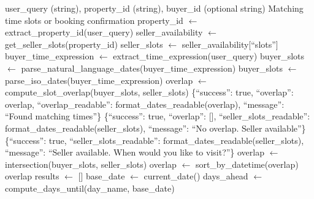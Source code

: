 \begin{algorithm}[H]
\caption{Booking Agent Slot Matching}
\label{alg:booking}
\begin{algorithmic}[1]
\REQUIRE user\_query (string), property\_id (string), buyer\_id (optional string)
\ENSURE Matching time slots or booking confirmation
\STATE {}
    \STATE property\_id $\leftarrow$ extract\_property\_id(user\_query)
\ENDIF
\STATE
\STATE {}
\STATE seller\_availability $\leftarrow$ get\_seller\_slots(property\_id)
\STATE seller\_slots $\leftarrow$ seller\_availability[``slots'']
\STATE
\STATE {}
\STATE buyer\_time\_expression $\leftarrow$ extract\_time\_expression(user\_query)
\STATE
{}
    \STATE {}
        \STATE buyer\_slots $\leftarrow$ parse\_natural\_language\_dates(buyer\_time\_expression)
    \ELSE
        \STATE buyer\_slots $\leftarrow$ parse\_iso\_dates(buyer\_time\_expression)
    \ENDIF
    \STATE
    \STATE {}
    \STATE overlap $\leftarrow$ compute\_slot\_overlap(buyer\_slots, seller\_slots)
    \STATE
        \RETURN \{``success'': true, ``overlap'': overlap, ``overlap\_readable'': format\_dates\_readable(overlap), ``message'': ``Found matching times''\}
    \ELSE
        \RETURN \{``success'': true, ``overlap'': [], ``seller\_slots\_readable'': format\_dates\_readable(seller\_slots), ``message'': ``No overlap. Seller available''\}
    \ENDIF
\ELSE
    \STATE {}
    \RETURN \{``success'': true, ``seller\_slots\_readable'': format\_dates\_readable(seller\_slots), ``message'': ``Seller available. When would you like to visit?''\}
\ENDIF
\STATE
{}
    \STATE overlap $\leftarrow$ intersection(buyer\_slots, seller\_slots)
    \STATE overlap $\leftarrow$ sort\_by\_datetime(overlap)
    \RETURN overlap
\ENDFUNCTION
\STATE
{}
    \STATE results $\leftarrow$ []
    \STATE base\_date $\leftarrow$ current\_date()
    \STATE
    \STATE {}
            \STATE days\_ahead $\leftarrow$ compute\_days\_until(day\_name, base\_date)

\end{algorithmic}
\end{algorithm}
